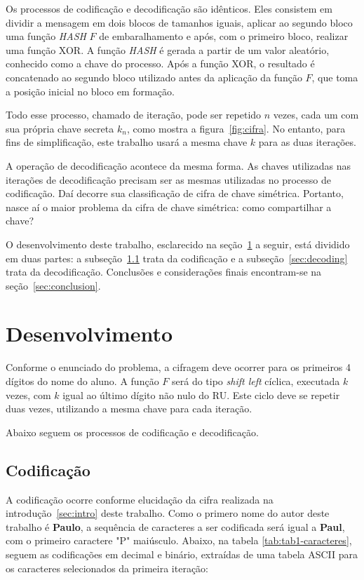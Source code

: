 \documentclass[a4paper,pra,aps,twocolumn,superscriptaddress,10pt,final]{revtex4-2}
\begin{document}
    Os processos de codificação e decodificação são idênticos. Eles consistem em dividir a mensagem em dois blocos de tamanhos iguais, aplicar ao segundo bloco uma função \textit{HASH} $F$ de embaralhamento e após, com o primeiro bloco, realizar uma função XOR. A função \textit{HASH}  é gerada a partir de um valor aleatório, conhecido como a chave do processo. Após a função XOR, o resultado é concatenado ao segundo bloco utilizado antes da aplicação da função $F$, que toma a posição inicial no bloco em formação.
    
    Todo esse processo, chamado de iteração, pode ser repetido $n$ vezes, cada um com sua própria chave secreta $k_n$, como mostra a figura~\ref{fig:cifra}. No entanto, para fins de simplificação, este trabalho usará a mesma chave $k$ para as duas iterações.

    A operação de decodificação acontece da mesma forma. As chaves utilizadas nas iterações de decodificação precisam ser as mesmas utilizadas no processo de codificação. Daí decorre sua classificação de cifra de chave simétrica. Portanto, nasce aí o maior problema da cifra de chave simétrica: como compartilhar a chave?
    
    O desenvolvimento deste trabalho, esclarecido na seção~\ref{sec:develop} a seguir, está dividido em duas partes: a subseção~\ref{sec:coding} trata da codificação e a subseção~\ref{sec:decoding} trata da decodificação. Conclusões e considerações finais encontram-se na seção~\ref{sec:conclusion}.

    \section{Desenvolvimento}
    \label{sec:develop}

    Conforme o enunciado do problema, a cifragem deve ocorrer para os primeiros 4 dígitos do nome do aluno. A função $F$ será do tipo \textit{shift left} cíclica, executada $k$ vezes, com $k$ igual ao último dígito não nulo do RU. Este ciclo deve se repetir duas vezes, utilizando a mesma chave para cada iteração.

    Abaixo seguem os processos de codificação e decodificação.

    \subsection{Codificação}
    \label{sec:coding}

    A codificação ocorre conforme elucidação da cifra realizada na introdução~\ref{sec:intro} deste trabalho. Como o primero nome do autor deste trabalho é \textbf{Paulo}, a sequência de caracteres a ser codificada será igual a \textbf{Paul}, com o primeiro caractere "P" maiúsculo. Abaixo, na tabela \ref{tab:tab1-caracteres}, seguem as codificações em decimal e binário, extraídas de uma tabela ASCII para os caracteres selecionados da primeira iteração:
\end{document}
